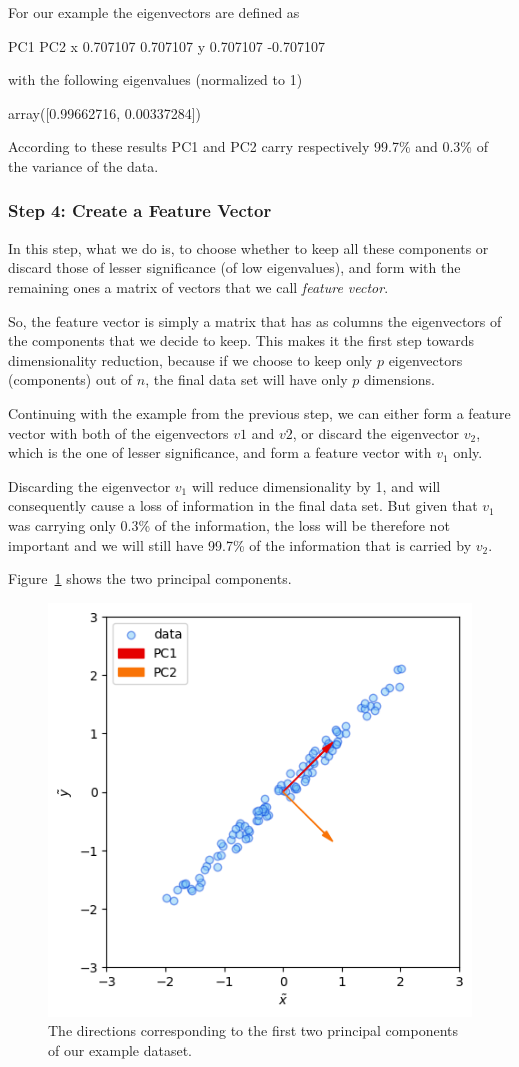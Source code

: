 For our example the eigenvectors are defined as
\begin{ioutput}
        PC1       PC2
x  0.707107  0.707107
y  0.707107 -0.707107
\end{ioutput}
with the following eigenvalues (normalized to 1)
\begin{ioutput}
array([0.99662716, 0.00337284])
\end{ioutput}

According to these results PC1 and PC2 carry respectively 99.7\% and 0.3\% of the variance of the data.

\subsubsection*{Step 4: Create a Feature Vector}

In this step, what we do is, to choose whether to keep all these components or discard those of lesser significance (of low eigenvalues), and form with the remaining ones a matrix of vectors that we call \emph{feature vector}.

So, the feature vector is simply a matrix that has as columns the eigenvectors of the components that we decide to keep. This makes it the first step towards dimensionality reduction, because if we choose to keep only $p$ eigenvectors (components) out of $n$, the final data set will have only $p$ dimensions.

Continuing with the example from the previous step, we can either form a feature vector with both of the eigenvectors $v1$ and $v2$, or discard the eigenvector $v_2$, which is the one of lesser significance, and form a feature vector with $v_1$ only.

Discarding the eigenvector $v_1$ will reduce dimensionality by 1, and will consequently cause a loss of information in the final data set. But given that $v_1$ was carrying only 0.3\% of the information, the loss will be therefore not important and we will still have 99.7\% of the information that is carried by $v_2$.

Figure~\ref{fig:pca_result} shows the two principal components.

\begin{figure}[hbt]
\centering
\includegraphics[width=0.5\linewidth]{figures/pca_components}
\caption{The directions corresponding to the first two principal components of our example dataset.}
\label{fig:pca_result}
\end{figure}

